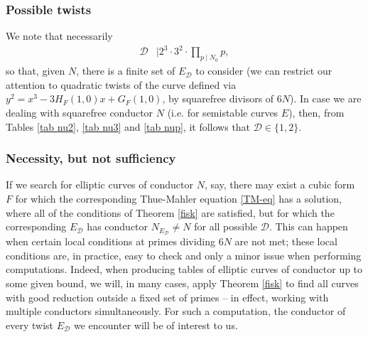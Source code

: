 \documentclass[11pt]{report}
\theoremstyle{definition}
\begin{document}
\subsubsection{Possible twists}
We note that necessarily
\begin{align} \label{froggie}
\mathcal{D} &\mid 2^3 \cdot 3^2 \cdot \prod_{p \mid N_0} p,
\end{align}
so that, given $N$, there is a finite set of $E_{\mathcal{D}}$ to consider (we can restrict our attention to quadratic twists of the curve defined via
$y^2=x^3 - 3 H_F(1,0) x  + G_F (1,0)$,
by squarefree divisors of $6N$). In  case we are dealing with squarefree conductor $N$ (i.e. for semistable curves $E$), then, from Tables \ref{tab nu2}, \ref{tab nu3} and \ref{tab nup}, it follows that $\mathcal{D} \in \{ 1, 2 \}$.


\subsubsection{Necessity, but not sufficiency}
If we search for elliptic curves of conductor $N$, say, there may exist a cubic form $F$ for which the corresponding Thue-Mahler equation \eqref{TM-eq}  has a
solution, where all of the conditions of Theorem \ref{fisk} are satisfied, but for which the corresponding  $E_{\mathcal{D}}$ has conductor $N_{E_{\mathcal{D}}} \neq N$ for all possible $\mathcal{D}$. This can happen when
certain local conditions at primes dividing $6N$ are not met; these local conditions are, in practice, easy to check and only a minor issue when
performing computations. Indeed, when producing tables of elliptic curves of conductor up to some given bound, we will, in many cases,  apply Theorem \ref{fisk} to find all curves with good reduction outside a fixed set of primes -- in effect, working with
multiple conductors simultaneously. For such a computation, the conductor of every twist $E_{\mathcal{D}}$ we encounter will be of interest to
us.
\end{document}
